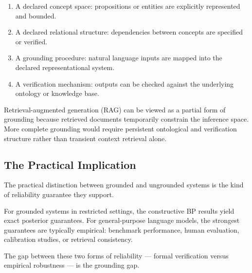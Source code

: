\begin{enumerate}
\item A declared concept space: propositions or entities are explicitly
represented and bounded.

\item A declared relational structure: dependencies between concepts are
specified or verified.

\item A grounding procedure: natural language inputs are mapped into the
declared representational system.

\item A verification mechanism: outputs can be checked against the
underlying ontology or knowledge base.
\end{enumerate}

Retrieval-augmented generation (RAG) can be viewed as a partial form of
grounding because retrieved documents temporarily constrain the inference
space. More complete grounding would require persistent ontological and
verification structure rather than transient context retrieval alone.

\subsection*{The Practical Implication}

The practical distinction between grounded and ungrounded systems is the
kind of reliability guarantee they support.

For grounded systems in restricted settings, the constructive BP results
yield exact posterior guarantees. For general-purpose language models,
the strongest guarantees are typically empirical: benchmark performance,
human evaluation, calibration studies, or retrieval consistency.

The gap between these two forms of reliability --- formal verification
versus empirical robustness --- is the grounding gap.